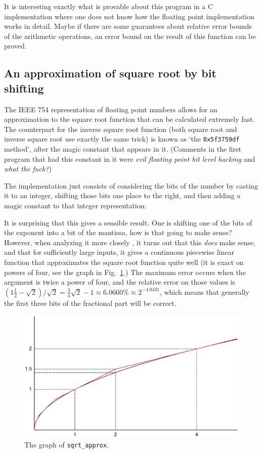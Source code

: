 \documentclass{article}
\begin{document}
It is interesting exactly what is provable about this program
in a C implementation where one does not know how the floating
point implementation works in detail.
Maybe if there are some guarantees about relative error bounds
of the arithmetic operations, an error bound on the result of this
function can be proved.

\subsection{An approximation of square root by bit shifting}\label{bitshift}
The IEEE 754 representation of floating point numbers allows
for an approximation to the square root function
that can be calculated extremely fast.
The counterpart for the inverse square root function (both square
root and inverse square root
use exactly the same trick) is known
as `the \lstinline|0x5f3759df| method',
after the magic constant that appears in it.
(Comments in the first program that had this constant
in it were \emph{evil floating point bit level hacking} and \emph{what the fuck?})

The implementation just consists of considering the bits of the number by casting it to an integer,
shifting those bits one place to the right, and then adding a magic constant to that integer representation:

It is surprising that this gives a sensible result.
One is shifting one of the bits of the exponent into a bit of the
mantissa, how is that going to make sense?
However, when analyzing it more closely \cite{bli:97}, it turns
out that this \emph{does} make sense, and that for sufficiently large inputs, it gives a continuous piecewise linear function that 
approximates the square root function quite well (it is exact
on powers of four, see the graph in Fig.~\ref{sqrt_approx}.)
The maximum error occurs when the argument is twice a power of four, and the
relative error on those values is $(1\frac{1}{2} - \sqrt{2})/\sqrt{2} = \frac{3}{4}\sqrt{2} - 1 \approx 6.0660\% \approx 2^{-4.0431}$,
which means that generally the first three bits of the fractional part will be correct.
\begin{figure}
\begin{center}
\includegraphics[width=.9\textwidth]{sqrt_approx}
\end{center}
\caption{The graph of \lstinline|sqrt_approx|.}\label{sqrt_approx}
\end{figure}
\end{document}
